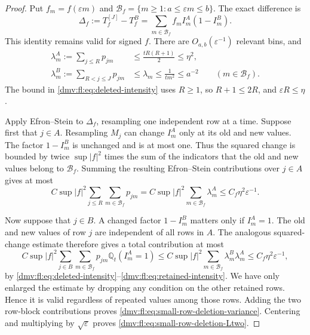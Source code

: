 \documentclass[11pt,letterpaper]{article}
\numberwithin{equation}{section}
\theoremstyle{definition}\newtheorem{definition}[theorem]{Definition}
\theoremstyle{remark}\newtheorem{remark}[theorem]{Remark}
\newcommand{\Q}{\mathbb Q}
\newcommand{\eps}{\varepsilon}
\begin{document}
\begin{proof}
Put $f_m=f(\eps m)$ and
$\mathcal B_f=\{m\ge1:a\le\eps m\le b\}$.
The exact difference is
\[
 \Delta_f:=T_f^{[J]}-T_f^B
 =\sum_{m\in\mathcal B_f}f_m I_m^A(1-I_m^B).
\]
This identity remains valid for signed $f$.
There are $O_{a,b}(\eps^{-1})$ relevant bins, and
\begin{align}
 \lambda_m^A:=\sum_{j\le R}p_{jm}
 &\le \frac{tR(R+1)}2\le\eta^2,
 \label{dmv:fl:eq:deleted-intensity}\\
 \lambda_m^B:=\sum_{R<j\le J}p_{jm}
 &\le\lambda_m\le\frac1{tm^2}\le a^{-2}
       \qquad(m\in\mathcal B_f).
 \label{dmv:fl:eq:retained-intensity}
\end{align}
The bound in \eqref{dmv:fl:eq:deleted-intensity} uses $R\ge1$, so
$R+1\le2R$, and $\eps R\le\eta$.

Apply Efron--Stein to $\Delta_f$, resampling one independent row at
a time. Suppose first that $j\in A$. Resampling $M_j$ can change
$I_m^A$ only at its old and new values. The factor $1-I_m^B$ is
unchanged and is at most one. Thus the squared change is bounded
by twice $\sup|f|^2$ times the sum of the indicators that the old
and new values belong to $\mathcal B_f$. Summing the resulting
Efron--Stein contributions over $j\in A$ gives at most
\[
 C\sup|f|^2
   \sum_{j\le R}\sum_{m\in\mathcal B_f}p_{jm}
 =
 C\sup|f|^2\sum_{m\in\mathcal B_f}\lambda_m^A
 \le C_f\eta^2\eps^{-1}.
\]

Now suppose that $j\in B$. A changed factor $1-I_m^B$ matters only
if $I_m^A=1$. The old and new values of row $j$ are independent
of all rows in $A$. The analogous squared-change estimate
therefore gives a total contribution at most
\[
 C\sup|f|^2
 \sum_{j\in B}\sum_{m\in\mathcal B_f}
     p_{jm}\Q_t(I_m^A=1)
 \le
 C\sup|f|^2
 \sum_{m\in\mathcal B_f}\lambda_m^B\lambda_m^A
 \le C_f\eta^2\eps^{-1},
\]
by \eqref{dmv:fl:eq:deleted-intensity}--\eqref{dmv:fl:eq:retained-intensity}.
We have only enlarged the estimate by dropping any condition on
the other retained rows. Hence it is valid regardless of repeated
values among those rows.
Adding the two row-block contributions proves
\eqref{dmv:fl:eq:small-row-deletion-variance}. Centering and multiplying
by $\sqrt\eps$ proves \eqref{dmv:fl:eq:small-row-deletion-Ltwo}.
\end{proof}
\end{document}

